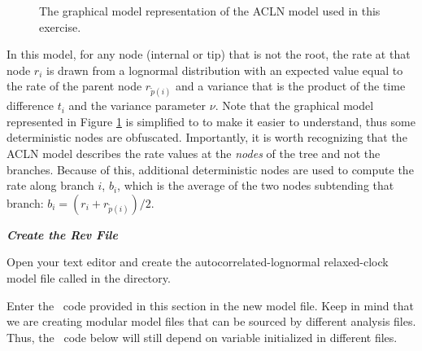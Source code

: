 \begin{figure}[h!]
\centering
{}
\caption{\small The graphical model representation of the ACLN model used in this exercise.}
\label{m_ACLN:fig}
\end{figure}

In this model, for any node (internal or tip) that is not the root, the rate at that node $r_i$ is drawn from a lognormal distribution with an expected value equal to the rate of the parent node $r_{\tilde{p}(i)}$ and a variance that is the product of the time difference $t_i$ and the variance parameter $\nu$. 
Note that the graphical model represented in Figure \ref{m_ACLN:fig} is simplified to to make it easier to understand, thus some deterministic nodes are obfuscated.  
Importantly, it is worth recognizing that the ACLN model describes the rate values at the \textit{nodes} of the tree and not the branches. 
Because of this, additional deterministic nodes are used to compute the rate along branch $i$, $b_i$, which is the average of the two nodes subtending that branch: $b_i = (r_i + r_{\tilde{p}(i)}) / 2$.

\textbf{\textit{Create the Rev File}}

{\begin{framed}
Open your text editor and create the autocorrelated-lognormal relaxed-clock model file called {\textcolor{red}{}} in the  directory.

Enter the \Rev~code provided in this section in the new model file. Keep in mind that we are creating modular model files that can be sourced by different analysis files. Thus, the \Rev~code below will still depend on variable initialized in different files.
\end{framed}}



